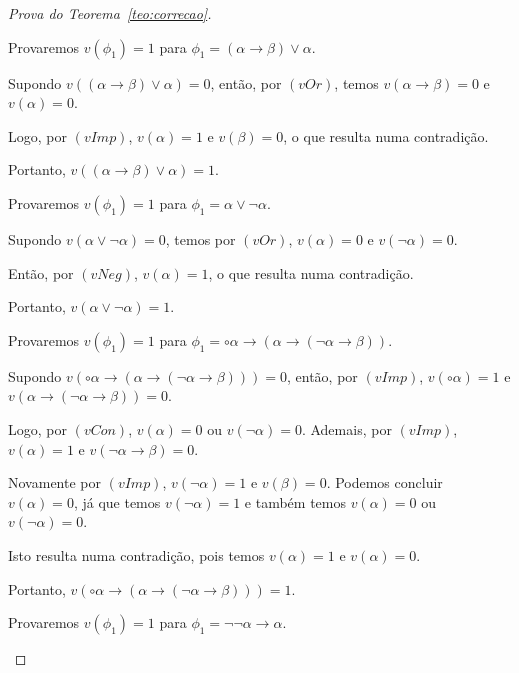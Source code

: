 \begin{proof}[Prova do Teorema~\ref{teo:correcao}]
\begin{provaporcasos}
\begin{provaporsubcasos}
                \subcasodeprova Provaremos $v(\phi_{1}) = 1$ para $\phi_{1} = (\alpha \to \beta) \lor \alpha$. 
                    
                    Supondo $v((\alpha \to \beta) \lor \alpha) = 0$, então, por $(vOr)$, temos $v(\alpha \to \beta) = 0$ e $v(\alpha) = 0$. 
                    
                    Logo, por $(vImp)$, $v(\alpha) = 1$  e $v(\beta) = 0$, o que resulta numa contradição. 
                    
                    Portanto, $v((\alpha \to \beta) \lor \alpha) = 1$.

                \subcasodeprova Provaremos $v(\phi_{1}) = 1$ para $\phi_{1} = \alpha \lor \neg \alpha$. 
                
                    Supondo $v(\alpha \lor \neg \alpha) = 0$, temos por $(vOr)$, $v(\alpha) = 0$ e $v(\neg \alpha) = 0$. 
                    
                    Então, por $(vNeg)$, $v(\alpha) = 1$, o que resulta numa contradição. 
                    
                    Portanto, $v(\alpha \lor \neg \alpha) = 1$.

                \subcasodeprova Provaremos $v(\phi_{1}) = 1$ para $\phi_{1} = \circ \alpha \to (\alpha \to (\neg \alpha \to \beta))$. 
                
                    Supondo $v(\circ \alpha \to (\alpha \to (\neg \alpha \to \beta))) = 0$, então, por $(vImp)$, $v(\circ \alpha) = 1$ e $v(\alpha \to (\neg \alpha \to \beta)) = 0$. 
                    
                    Logo, por $(vCon)$, $v(\alpha) = 0$ ou $v(\neg \alpha) = 0$. Ademais, por $(vImp)$, $v(\alpha) = 1$ e $v(\neg \alpha \to \beta) = 0$. 
                    
                    Novamente por $(vImp)$, $v(\neg \alpha) = 1$ e $v(\beta) = 0$. Podemos concluir $v(\alpha) = 0$, já que temos $v(\neg \alpha) = 1$ e também temos $v(\alpha) = 0$ ou $v(\neg \alpha) = 0$. 
                    
                    Isto resulta numa contradição, pois temos $v(\alpha) = 1$ e $v(\alpha) = 0$. 
                    
                    Portanto, $v(\circ \alpha \to (\alpha \to (\neg \alpha \to \beta))) = 1$.

                \subcasodeprova Provaremos $v(\phi_{1}) = 1$ para $\phi_{1} = \neg \neg \alpha \to \alpha$. 
                    

\end{provaporsubcasos}
\end{provaporcasos}
\end{proof}
